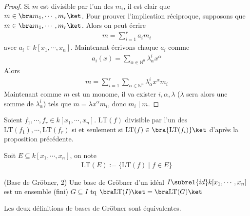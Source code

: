         \begin{proof}
            Si $m$ est divisible par l'un des $m_i$, il est clair que $m \in \bra m_1, \cdots, m_r \ket$. Pour prouver l'implication réciproque, supposons que $m \in \bra m_1, \cdots, m_r \ket$. Alors on peut écrire
            \begin{align*}
                m = \sum_{i = 1}^r a_i m_i
            \end{align*}
            avec $a_i \in k[x_1, \cdots, x_n]$. Maintenant écrivons chaque $a_i$ comme
            \begin{align*}
                a_i(x) = \sum_{\alpha \in \mathbb{N}^n} \lambda_\alpha^i x^{\alpha}
            \end{align*}
            Alors
            \begin{align*}
                m = \sum_{i = 1}^r \sum_{\alpha \in \mathbb{N}^n} \lambda_\alpha^i x^{\alpha} m_i
            \end{align*}
            Maintenant comme $m$ est un monome, il va exister $i, \alpha, \lambda$ ($\lambda$ sera alors une somme de $\lambda_\alpha^i$) tels que $m = \lambda x^\alpha m_i$, donc $m_i \mid m$.
        \end{proof}
        Soient $f_1, \cdots, f_r \in k[x_1, \cdots, x_n]$. $\mathrm{LT}(f)$ divisible par l'un des $\mathrm{LT}(f_1), \cdots, \mathrm{LT}(f_r)$ si et seulement si $\mathrm{LT}(f) \in \bra \{\mathrm{LT}(f_i)\} \ket$ d'après la proposition précédente. \\
        \begin{nota}
            Soit $E \subseteq k[x_1, \cdots, x_n]$, on note
            \begin{align*}
                \mathrm{LT}(E) := \{\mathrm{LT}(f) \mid f \in E\}
            \end{align*}
        \end{nota}
        \begin{defi} (Base de Gröbner, 2)
            Une base de Gröbner d'un idéal $I \subrel{id} k[x_1, \cdots, x_n]$ est un ensemble (fini) $G \subseteq I$ tq $\bra \mathrm{LT}(I) \ket = \bra \mathrm{LT}(G) \ket$
        \end{defi}
        \begin{theo}
            Les deux définitions de bases de Gröbner sont équivalentes.
        \end{theo}
